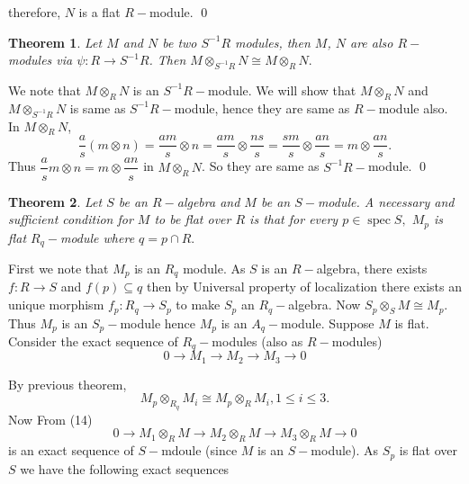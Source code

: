 \documentclass[11pt]{amsart}
\newtheorem{theorem}{Theorem}[section]
\newcommand\isom{\mathrel{\stackon[-0.1ex]{\makebox*{\scalebox{1.08}{\AC}}{=\hfill\llap{=}}}{{\AC}}}}
\newcommand\nvisom{\rotatebox[origin=cc] {-90}{$ \isom $}}
\DeclareMathOperator{\spec}{\text{spec}}
\begin{document}
\begin{center}
\end{center}
 
therefore, $N$ is a flat $R-$module. \qed

\begin{theorem}
Let $M$ and $N$ be two $S^{-1}R$ modules, then $M$, $N$ are also $R-$modules via $\psi:R\to S^{-1}R$. Then $M\otimes_{S^{-1}R} N\cong M\otimes_R N.$
\end{theorem}

\proof We note that $M\otimes_R N$ is an $S^{-1}R-$module. We will show that $M\otimes_R N$ and $M\otimes_{S^{-1}R} N$ is same as $S^{-1}R-$module, hence they are same as $R-$module also. In $M\otimes_R N$, $$\dfrac{a}{s}(m\otimes n)=\dfrac{am}{s}\otimes n=\dfrac{am}{s}\otimes \dfrac{ns}{s}=\dfrac{sm}{s}\otimes \dfrac{an}{s}=m\otimes \dfrac{an}{s}.$$ Thus $\dfrac{a}{s}m\otimes n=m\otimes \dfrac{an}{s}$ in $M\otimes_R N$. So they are same as $S^{-1}R-$module. \qed

\begin{theorem}
Let $S$ be an $R-$algebra and $M$ be an $S-$module. A necessary and sufficient condition for $M$ to be flat over $R$ is that for every $p\in \spec S,$ $M_p$ is flat $R_q-$module where $q=p\cap R.$
\end{theorem}

\proof First we note that $M_p$ is an $R_q$ module. As $S$ is an $R-$algebra, there exists $f:R\to S$ and $f(p)\subseteq q$ then by Universal property of localization there exists an unique morphism $f_p:R_q\to S_p$ to make $S_p$ an $R_q-$algebra. Now $S_p\otimes_S M\cong M_p$. Thus $M_p$ is an $S_p-$module hence $M_p$ is an $A_q-$module. Suppose $M$ is flat. Consider the exact sequence of $R_q-$modules (also as $R-$modules) \begin{equation}
0\to M_1\to M_2\to M_3\to 0
\end{equation}

By previous theorem, \begin{equation}
M_p\otimes_{R_q} M_i\cong M_p\otimes_R M_i,1\leq i\leq 3.
\end{equation} 
Now From (14) $$0\to M_1\otimes_R M\to M_2\otimes_R M\to M_3\otimes_R M\to 0$$ is an exact sequence of $S-$mdoule (since $M$ is an $S-$module). As $S_p$ is flat over $S$ we have the following exact sequences 
\end{document}
